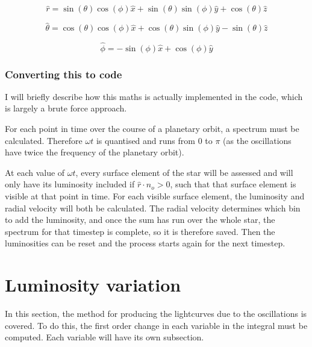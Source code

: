 \documentclass[11pt]{amsart}
\begin{document}
\begin{equation}
\hat{r} = \sin(\theta) \cos(\phi) \hat{x} + \sin(\theta) \sin(\phi) \hat{y} + \cos(\theta) \hat{z}
\end{equation}

\begin{equation}
\hat{\theta} = \cos(\theta) \cos(\phi) \hat{x} + \cos(\theta) \sin(\phi) \hat{y} - \sin(\theta) \hat{z}
\end{equation}

\begin{equation}
\hat{\phi} = - \sin(\phi) \hat{x} + \cos(\phi) \hat{y}
\end{equation}


\subsubsection{Converting this to code}  \label{RV:Implementation:Code}

I will briefly describe how this maths is actually implemented in the code, which is largely a brute force approach.

For each point in time over the course of a planetary orbit, a spectrum must be calculated.  Therefore $\omega t$ is quantised and runs from $0$ to $\pi$ (as the oscillations have twice the frequency of the planetary orbit).

At each value of $\omega t$, every surface element of the star will be assessed and will only have its luminosity included if $\hat{r} \! \cdot \! \hat{n}_{o} > 0$, such that that surface element is visible at that point in time.  For each visible surface element, the luminosity and radial velocity will both be calculated.  The radial velocity determines which bin to add the luminosity, and once the sum has run over the whole star, the spectrum for that timestep is complete, so it is therefore saved.  Then the luminosities can be reset and the process starts again for the next timestep.








\section{Luminosity variation} \label{Lum}

In this section, the method for producing the lightcurves due to the oscillations is covered.  To do this, the first order change in each variable in the integral must be computed.  Each variable will have its own subsection.
\end{document}

